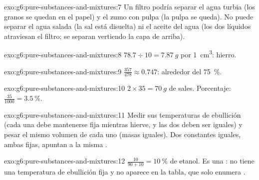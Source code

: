 \begin{solution}{exo:g6:pure-substances-and-mixtures:7}
Un filtro podría separar el agua turbia (los granos se quedan en el
papel) y el zumo con pulpa (la pulpa se queda). No puede separar el
agua salada (la sal está disuelta) ni el aceite del agua (los dos
líquidos atraviesan el filtro; se separan vertiendo la capa de arriba).
\end{solution}

\begin{solution}{exo:g6:pure-substances-and-mixtures:8}
$78.7 \div 10 = \qty{7.87}{g}$ por \qty{1}{cm^3}: hierro.
\end{solution}

\begin{solution}{exo:g6:pure-substances-and-mixtures:9}
$\frac{357}{478} \approx 0.747$: alrededor del \qty{75}{\percent}.
\end{solution}

\begin{solution}{exo:g6:pure-substances-and-mixtures:10}
$2 \times 35 = \qty{70}{g}$ de sales. Porcentaje: $\frac{35}{1000} =
\qty{3.5}{\percent}$.
\end{solution}

\begin{solution}{exo:g6:pure-substances-and-mixtures:11}
Medir sus temperaturas de ebullición (cada una debe mantenerse fija
mientras hierve, y las dos deben ser iguales) y pesar el mismo volumen
de cada uno (masas iguales). Dos constantes iguales, ambas fijas, apuntan
a la misma .
\end{solution}

\begin{solution}{exo:g6:pure-substances-and-mixtures:12}
$\frac{10}{90 + 10} = \qty{10}{\percent}$ de etanol. Es una : no
tiene una temperatura de ebullición fija y no aparece en la tabla, que
solo enumera .
\end{solution}

